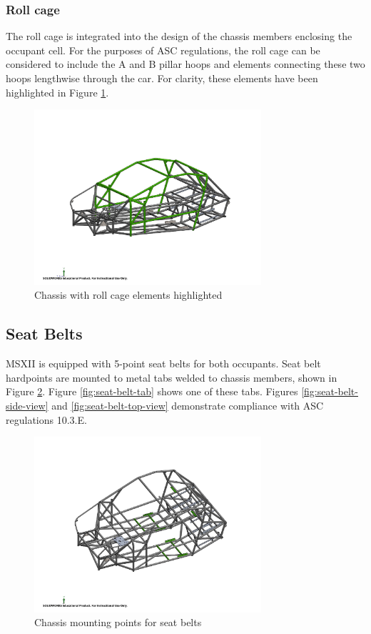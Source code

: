 \documentclass[10pt]{article}
\begin{document}
\subsubsection{Roll cage}
The roll cage is integrated into the design of the chassis members enclosing the occupant cell. For the purposes of ASC regulations, the roll cage can be considered to include the A and B pillar hoops and elements connecting these two hoops lengthwise through the car. For clarity, these elements have been highlighted in Figure \ref{fig:roll-cage}.

\begin{figure}
\centering
\includegraphics[width=0.75\textwidth]{figures/roll-cage}
\caption{Chassis with roll cage elements highlighted}
\label{fig:roll-cage}
\end{figure}


\subsection{Seat Belts}
MSXII is equipped with 5-point seat belts for both occupants. Seat belt hardpoints are mounted to metal tabs welded to chassis members, shown in Figure \ref{fig:seat-belt-tab-positions}. Figure \ref{fig:seat-belt-tab} shows one of these tabs. Figures \ref{fig:seat-belt-side-view} and \ref{fig:seat-belt-top-view} demonstrate compliance with ASC regulations 10.3.E.

\begin{figure}
\centering
\includegraphics[width=0.75\textwidth]{figures/seat-belt-tab-positions}
\caption{Chassis mounting points for seat belts}
\label{fig:seat-belt-tab-positions}
\end{figure}
\end{document}
